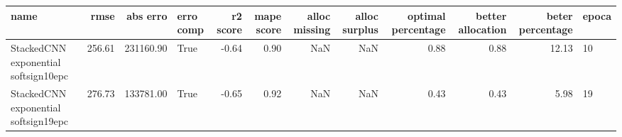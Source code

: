 \begin{tabular}{lrrlrrrrrrrl}
\toprule
name & rmse & abs erro & erro comp & r2 score & mape score & alloc missing & alloc surplus & optimal percentage & better allocation & beter percentage & epoca \\
\midrule
StackedCNN exponential softsign10epc & 256.61 & 231160.90 & True & -0.64 & 0.90 & NaN & NaN & 0.88 & 0.88 & 12.13 & 10 \\
StackedCNN exponential softsign19epc & 276.73 & 133781.00 & True & -0.65 & 0.92 & NaN & NaN & 0.43 & 0.43 & 5.98 & 19 \\
\bottomrule
\end{tabular}
